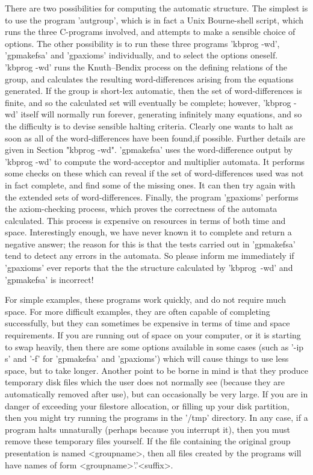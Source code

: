There are two possibilities for computing the automatic structure.
The simplest is to use the program 'autgroup', which is in fact a
Unix Bourne-shell script, which runs the three C-programs involved,
and attempts to make a sensible choice of options.
The other possibility is to run these three programs 'kbprog -wd',
'gpmakefsa' and 'gpaxioms' individually, and to select the options oneself.
'kbprog -wd' runs the Knuth--Bendix process on the defining relations of the
group, and calculates the resulting word-differences arising from the
equations generated. If the group is short-lex automatic, then the set
of word-differences is finite, and so the calculated set will eventually
be complete; however, 'kbprog -wd' itself will normally run forever, generating
infinitely many equations, and so the difficulty is to devise sensible
halting criteria. Clearly one wants to halt as soon as all of the
word-differences have been found,if possible. Further details are given in
Section "kbprog -wd". 'gpmakefsa' uses the word-difference output by
'kbprog -wd' to compute the word-acceptor and multiplier automata.
It performs some checks on these which can reveal if the set of
word-differences used was not in fact complete, and find some of the
missing ones. It can then try again with the extended sets of
word-differences. Finally, the program 'gpaxioms' performs the
axiom-checking process, which proves the correctness of the automata
calculated. This process is expensive on resources in terms of both time
and space. Interestingly enough, we have never known it to complete and
return a negative answer; the reason for this is that the tests carried
out in 'gpmakefsa' tend to detect any errors in the automata.
So please inform me immediately if 'gpaxioms' ever reports that the
the structure calculated by 'kbprog\ -wd' and 'gpmakefsa' is incorrect!

For simple examples, these programs work quickly, and do not require
much space. For more difficult examples, they are often capable of
completing successfully, but they can sometimes be expensive in terms of
time and space requirements. If you are running out of space on your computer,
or it is starting to swap heavily, then there are some options available
in some cases (such as '-ip s' and '-f' for 'gpmakefsa' and 'gpaxioms')
which will cause things to use less space, but to take longer.
Another point to be borne in mind is that they produce temporary disk
files which the user does not normally see (because they are
automatically removed after use), but can occasionally be very large.
If you are in danger of exceeding your filestore allocation, or filling up
your disk partition, then you might try running the programs in the '/tmp'
directory. In any case, if a program halts unnaturally (perhaps because
you interrupt it), then you must remove these temporary files yourself.
If the file containing the original group presentation is  named
<groupname>, then all files created by the programs will have names of
form <groupname>'.'<suffix>.

